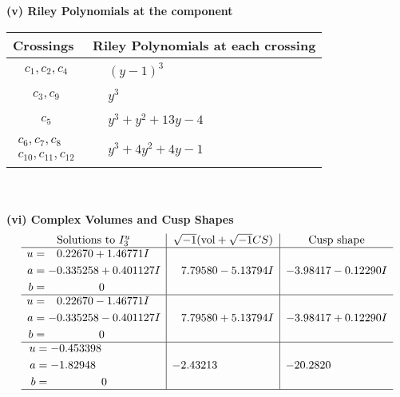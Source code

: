 \documentclass[1p]{elsarticle_modified}
\theoremstyle{definition}
\newcommand{\I}{\sqrt{-1}}
\begin{document}
\newpage\renewcommand{\arraystretch}{1}
\flushleft \textbf{(v) Riley Polynomials at the component}\newline \\
\begin{tabular}{m{50pt}|m{274pt}}
Crossings & \hspace{64pt}Riley Polynomials at each crossing \\
\hline $$\begin{aligned}c_{1},c_{2},c_{4}\end{aligned}$$&$\begin{aligned}
&(y-1)^3
\end{aligned}$\\
\hline $$\begin{aligned}c_{3},c_{9}\end{aligned}$$&$\begin{aligned}
&y^3
\end{aligned}$\\
\hline $$\begin{aligned}c_{5}\end{aligned}$$&$\begin{aligned}
&y^3+y^2+13 y-4
\end{aligned}$\\
\hline $$\begin{aligned}c_{6},c_{7},c_{8}\\c_{10},c_{11},c_{12}\end{aligned}$$&$\begin{aligned}
&y^3+4 y^2+4 y-1
\end{aligned}$\\
\hline
\end{tabular}\\~\\
\newpage\flushleft \textbf{(vi) Complex Volumes and Cusp Shapes}
$$\begin{array}{c|c|c}  
\text{Solutions to }I^u_{3}& \I (\text{vol} + \sqrt{-1}CS) & \text{Cusp shape}\\
 \hline 
\begin{aligned}
u &= \phantom{-}0.22670 + 1.46771 I \\
a &= -0.335258 + 0.401127 I \\
b &= \phantom{-0.000000 } 0\end{aligned}
 & \phantom{-}7.79580 - 5.13794 I & -3.98417 - 0.12290 I \\ \hline\begin{aligned}
u &= \phantom{-}0.22670 - 1.46771 I \\
a &= -0.335258 - 0.401127 I \\
b &= \phantom{-0.000000 } 0\end{aligned}
 & \phantom{-}7.79580 + 5.13794 I & -3.98417 + 0.12290 I \\ \hline\begin{aligned}
u &= -0.453398\phantom{ +0.000000I} \\
a &= -1.82948\phantom{ +0.000000I} \\
b &= \phantom{-0.000000 } 0\end{aligned}
 & -2.43213\phantom{ +0.000000I} & -20.2820\phantom{ +0.000000I}\\
 \hline 
 \end{array}$$\newpage\newpage\renewcommand{\arraystretch}{1}
\end{document}
